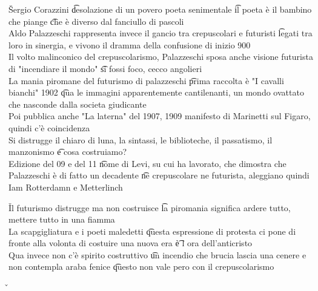 \documentclass[12pt]{article}
\begin{document}
\v

Sergio Corazzini \t desolazione di un povero poeta senimentale \t il poeta è il bambino che piange \t che è diverso dal fanciullo di pascoli \\
Aldo Palazzeschi rappresenta invece il gancio tra crepuscolari e futuristi \t legati tra loro in sinergia, e vivono il dramma della confusione di inizio 900 \\
Il volto malinconico del crepuscolarismo, Palazzeschi sposa anche visione futurista di "incendiare il mondo" \t si fossi foco, cecco angolieri \\
La mania piromane del futurismo di palazzeschi \t prima raccolta è "I cavalli bianchi" 1902 \t qua le immagini apparentemente cantilenanti, un mondo ovattato che nasconde dalla societa giudicante \\
Poi pubblica anche "La laterna" del 1907, 1909 manifesto di Marinetti sul Figaro, quindi c'è coincidenza \\
Si distrugge il chiaro di luna, la sintassi, le biblioteche, il passatismo, il manzonismo \t e cosa costruiamo? \\
Edizione del 09 e del 11 \t nome di Levi, su cui ha lavorato, che dimostra che Palazzeschi è di fatto un decadente \t ne crepuscolare ne futurista, aleggiano quindi Iam Rotterdamn e Metterlinch

\v

Il futurismo distrugge ma non costruisce \t la piromania significa ardere tutto, mettere tutto in una fiamma \\
La scapgigliatura e i poeti maledetti \t questa espressione di protesta ci pone di fronte alla volonta di costuire una nuova era \t è l ora dell'anticristo \\
Qua invece non c'è spirito costruttivo \t un incendio che brucia lascia una cenere e non contempla araba fenice \t questo non vale pero con il crepuscolarismo

\v
\end{document}
